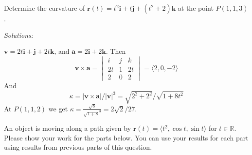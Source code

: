 \ifnum {}
\question[6] Determine the curvature of $\mathbf r(t) = t^2 \mathbf i + t \mathbf j + (t^2+2) \mathbf k$ at the point $P(1,1,3)$.

\ifnum {} {\color{DarkBlue} \textit{Solutions:} 

  $\mathbf v = 2t\mathbf i + \mathbf j + 2t\mathbf k$, and $\mathbf a = 2\mathbf i+2\mathbf k$. Then $$\mathbf v \times \mathbf a = \begin{vmatrix} i&j&k\\ 2t&1&2t \\2&0&2 \end{vmatrix} = \langle 2,0,-2 \rangle $$ And $$\kappa = |\mathbf v \times \mathbf a| / |\mathbf v|^3 = \sqrt{2^2 +2^2} / \sqrt{1+8t^2}$$ At $P(1,1,2)$ we get $\kappa = \frac{\sqrt{8}}{\sqrt{1+8}^3} = 2\sqrt2/27$.
    } 
   \else
      \vspace{6cm}
   \fi
\fi    

\ifnum {}
\question[6]  An object is moving along a path given by $\mathbf r(t) = \langle t^2 , \cos t, \sin t \rangle$ for $t \in \mathbb R$. Please show your work for the parts below. You can use your results for each part using results from previous parts of this question.   

